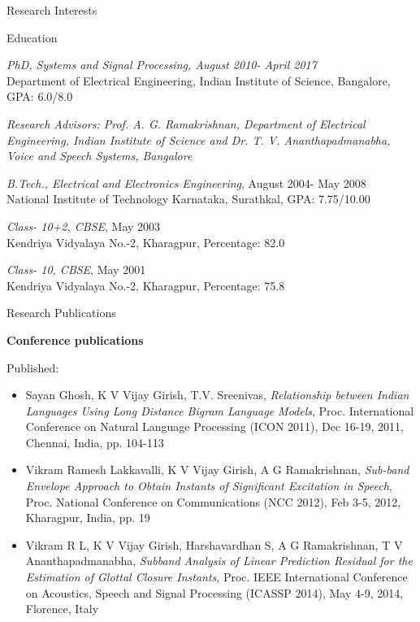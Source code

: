 \documentclass[10pt]{article}
\newenvironment{subbulletlist}{%
	\begin{list}{\labelitemii}{%
		\setlength{\topsep}{\itemsep}\setlength{\parskip}{\parsep}%
	}%
}%
{ \end{list} }
\begin{document}
\begin{cv}
\begin{cvlist}{Research Interests}
\begin{itemize}
\end{itemize}
\end{cvlist}


\begin{cvlist}{Education}
	\item \emph{PhD, Systems and Signal Processing, August 2010- April 2017}\\
	Department of Electrical
Engineering, Indian Institute of Science, Bangalore, GPA: 6.0/8.0
	\begin{subbulletlist}
		\item \emph{Research Advisors: Prof. A. G. Ramakrishnan, Department of Electrical Engineering, Indian Institute of Science and Dr. T. V. Ananthapadmanabha, Voice and Speech Systems, Bangalore
}
		
	\end{subbulletlist}
	\item \emph{B.Tech., Electrical and Electronics Engineering}, August 2004- May 2008\\
	National Institute of Technology Karnataka, Surathkal, GPA: 7.75/10.00
	\item \emph{Class- 10+2, CBSE}, May 2003 \\
	Kendriya Vidyalaya No.-2, Kharagpur, Percentage: 82.0
	\item \emph{Class- 10, CBSE}, May 2001 \\
	Kendriya Vidyalaya No.-2, Kharagpur, Percentage: 75.8
\end{cvlist}


\begin{cvlist}{Research Publications}
\item \textbf{Conference publications}
\item Published:
	\begin{itemize}\itemsep=0.25em
	\item Sayan Ghosh, K V Vijay Girish, T.V. Sreenivas, \textit{Relationship between Indian Languages Using Long Distance Bigram Language Models}, Proc. International Conference on Natural Language Processing (ICON
2011), Dec 16-19, 2011, Chennai, India, pp. 104-113


\item
Vikram Ramesh Lakkavalli, K V Vijay Girish, A G Ramakrishnan, \textit{Sub-band Envelope Approach to Obtain Instants of Significant Excitation in Speech}, Proc. National Conference on Communications (NCC 2012), Feb 3-5, 2012, Kharagpur, India, pp. 19

\item Vikram R L, K V Vijay Girish, Harshavardhan S, A G Ramakrishnan, T V Ananthapadmanabha, 
\textit{Subband Analysis of Linear Prediction Residual for the Estimation of Glottal Closure Instants}, Proc. IEEE International Conference on Acoustics, Speech and Signal Processing (ICASSP 2014), May 4-9, 2014, Florence, Italy


\end{itemize}
\end{cvlist}
\end{cv}
\end{document}
